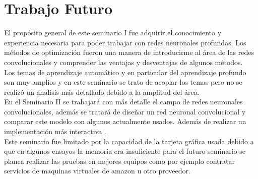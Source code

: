 \section{Trabajo Futuro}
El propósito general de este seminario I fue adquirir el conocimiento y experiencia necesaria para poder trabajar con redes neuronales profundas. Los métodos de optimización fueron una manera de introducirme al área de las redes convolucionales y comprender las ventajas y desventajas de algunos métodos. \\
Los temas de aprendizaje automático y en particular del aprendizaje profundo son muy amplios y en este seminario se trato de acoplar los temas pero no se realizó un análisis más detallado debido a la amplitud del área. \\
En el Seminario II se trabajará con más detalle el campo de redes neuronales convolucionales, además se tratará de diseñar un red neuronal convolucional y comparar este modelo con algunos actualmente usados. Además de realizar un implementación más interactiva .\\ Este seminario fue limitado por la capacidad de la tarjeta gráfica usada debido a que en algunos ensayos la memoria era insuficiente para el futuro seminario se planea realizar las pruebas en mejores equipos como por ejemplo contratar servicios de maquinas virtuales de amazon u otro proveedor.



